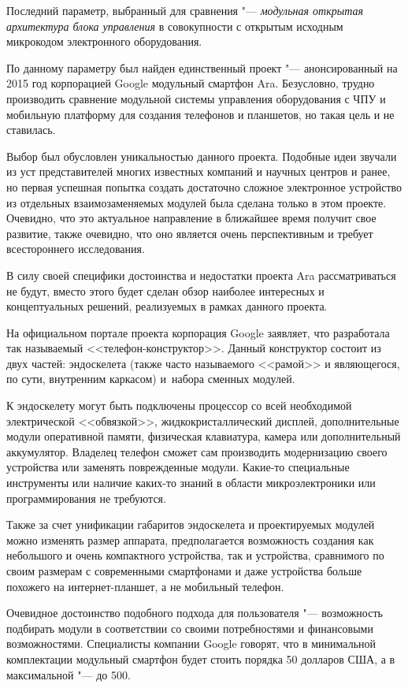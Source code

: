 Последний параметр, выбранный для сравнения "--- \textit{модульная открытая архитектура блока управления} в совокупности с открытым исходным микрокодом электронного оборудования.

По данному параметру был найден единственный проект "--- анонсированный на 2015 год корпорацией Google модульный смартфон Ara. Безусловно, трудно производить сравнение модульной системы управления оборудования с ЧПУ и мобильную платформу для создания телефонов и планшетов, но такая цель и не ставилась.

Выбор был обусловлен уникальностью данного проекта. Подобные идеи звучали из уст представителей многих известных компаний и научных центров и ранее, но первая успешная попытка создать достаточно сложное электронное устройство из отдельных взаимозаменяемых модулей была сделана только в этом проекте. Очевидно, что это актуальное направление в ближайшее время получит свое развитие, также очевидно, что оно является очень перспективным и требует всестороннего исследования.

В силу своей специфики достоинства и недостатки проекта Ara рассматриваться не будут, вместо этого будет сделан обзор наиболее интересных и концептуальных решений, реализуемых в рамках данного проекта.

На официальном портале проекта корпорация Google заявляет, что разработала так называемый <<телефон-конструктор>>. Данный конструктор состоит из двух частей: эндоскелета (также часто называемого <<рамой>> и являющегося, по сути, внутренним каркасом) и~набора сменных модулей.

К эндоскелету могут быть подключены процессор со всей необходимой электрической <<обвязкой>>, жидкокристаллический дисплей, дополнительные модули оперативной памяти, физическая клавиатура, камера или дополнительный аккумулятор. Владелец телефон сможет сам производить модернизацию своего устройства или заменять поврежденные модули. Какие-то специальные инструменты или наличие каких-то знаний в области микроэлектроники или программирования не требуются.

Также за счет унификации габаритов эндоскелета и проектируемых модулей можно изменять размер аппарата, предполагается возможность создания как небольшого и очень компактного устройства, так и устройства, сравнимого по своим размерам с современными смартфонами и даже устройства больше похожего на интернет-планшет, а не мобильный телефон.

Очевидное достоинство подобного подхода для пользователя "--- возможность подбирать модули в соответствии со своими потребностями и финансовыми возможностями. Специалисты компании Google говорят, что в минимальной комплектации модульный смартфон будет стоить порядка 50 долларов США, а в максимальной "--- до 500.

